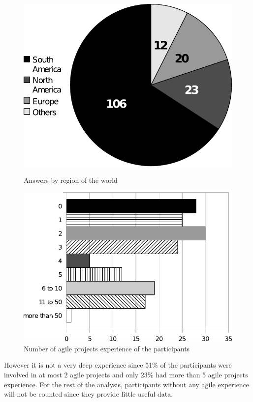 \documentclass[lnbip]{svmultln}
\begin{document}
\begin{figure}[htb]
  \begin{minipage}[t]{0.5\linewidth}
    \includegraphics[scale=0.5]{agile-world.pdf}
    \caption{Answers by region of the world}
    \label{fig:agile-world}
  \end{minipage}
  \begin{minipage}[t]{0.5\linewidth}
    \includegraphics[scale=0.5]{agile-xp.pdf}
    \caption{Number of agile projects experience of the participants}
    \label{fig:agile-xp}
  \end{minipage}
\end{figure}

However it is not a very deep experience since 51\% of the
participants were involved in at most 2 agile projects and only 23\%
had more than 5 agile projects experience. For the rest of the
analysis, participants without any agile experience will not be
counted since they provide little useful data.
\end{document}
